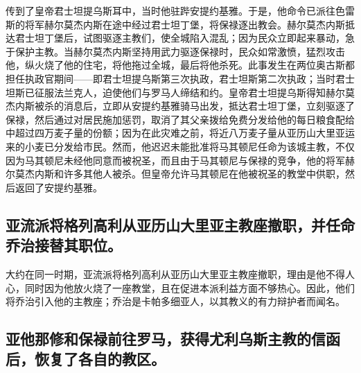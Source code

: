 传到了皇帝君士坦提乌斯耳中，当时他驻跸安提约基雅。于是，他命令已派往色雷斯的将军赫尔莫杰内斯在途中经过君士坦丁堡，将保禄逐出教会。赫尔莫杰内斯抵达君士坦丁堡后，试图驱逐主教们，使全城陷入混乱；因为民众立即起来暴动，急于保护主教。当赫尔莫杰内斯坚持用武力驱逐保禄时，民众如常激愤，猛烈攻击他，纵火烧了他的住宅，将他拖过全城，最后将他杀死。此事发生在两位奥古斯都担任执政官期间——即君士坦提乌斯第三次执政，君士坦斯第二次执政；当时君士坦斯已征服法兰克人，迫使他们与罗马人缔结和约。皇帝君士坦提乌斯得知赫尔莫杰内斯被杀的消息后，立即从安提约基雅骑马出发，抵达君士坦丁堡，立刻驱逐了保禄，然后通过对居民施加惩罚，取消了其父亲拨给免费分发给他的每日粮食配给中超过四万麦子量的份额；因为在此灾难之前，将近八万麦子量从亚历山大里亚运来的小麦已分发给市民。然而，他迟迟未能批准将马其顿尼任命为该城主教，不仅因为马其顿尼未经他同意而被祝圣，而且由于马其顿尼与保禄的竞争，他的将军赫尔莫杰内斯和许多其他人被杀。但皇帝允许马其顿尼在他被祝圣的教堂中供职，然后返回了安提约基雅。\par


\subsection{亚流派将格列高利从亚历山大里亚主教座撤职，并任命乔治接替其职位。}

大约在同一时期，亚流派将格列高利从亚历山大里亚主教座撤职，理由是他不得人心，同时因为他放火烧了一座教堂，且在促进本派利益方面不够热心。因此，他们将乔治引入他的主教座；乔治是卡帕多细亚人，以其教义的有力辩护者而闻名。\par


\subsection{亚他那修和保禄前往罗马，获得尤利乌斯主教的信函后，恢复了各自的教区。}

